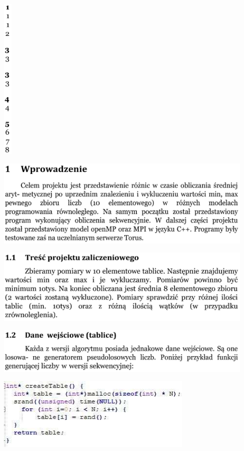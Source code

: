 \documentclass[
]{article}
\begin{document}
\includegraphics[width=0.16667in,height=3.22222in]{vertopal_45f5e71363bf454ba37a280ca069ec4b/media/image5.png}

\includegraphics[width=5.06944in,height=1.72222in]{vertopal_45f5e71363bf454ba37a280ca069ec4b/media/image6.png}

\includegraphics[width=5.06944in,height=1.45833in]{vertopal_45f5e71363bf454ba37a280ca069ec4b/media/image7.png}

\includegraphics[width=5.06944in,height=0.90278in]{vertopal_45f5e71363bf454ba37a280ca069ec4b/media/image8.png}

\includegraphics[width=3.82083in,height=1.42083in]{vertopal_45f5e71363bf454ba37a280ca069ec4b/media/image9.png}
\end{document}

